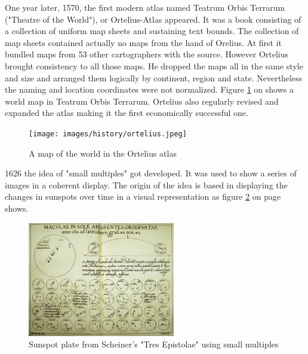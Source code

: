 One year later, 1570, the first modern atlas named Teatrum Orbis Terrarum ("Theatre of the World"), or Ortelius-Atlas appeared. It was a book consisting of a collection of uniform map sheets and sustaining text bounds. The collection of map sheets contained actually no maps from the hand of Orelius. At first it bundled maps from 53 other cartographers with the source. However Ortelius brought consistency to all those maps. He dropped the maps all in the same style and size and arranged them logically by continent, region and state. Nevertheless the naming and location coordinates were not normalized. Figure \ref{fig:ortelius} on \pageref{fig:ortelius} shows a world map in Teatrum Orbis Terrarum. Ortelius also regularly revised and expanded the atlas making it the first economically successful one.

\begin{figure}[!htb]
\centering
\texttt{[image: images/history/ortelius.jpeg]}
\caption[
    A map of the world in the Ortelius atlas, Urldate: 07.2016 \newline
\small\texttt{\url{https://upload.wikimedia.org/wikipedia/commons/6/6f/OrteliusWorldMap.jpeg}}
]{A map of the world in the Ortelius atlas}
\label{fig:ortelius}
\end{figure}

1626 the idea of "small multiples" got developed. It was used to show a series of images in a coherent display. The origin of the idea is based in displaying the changes in sunspots over time in a visual representation as figure \ref{fig:small-multiples} on page \pageref{fig:small-multiples} shows.

\begin{figure}[!htb]
\centering
\includegraphics[height=5cm,keepaspectratio]{images/history/small-multiples.png}
\caption[
    Sunspot plate from Scheiner's "Tres Epistolae" using small multiples, Urldate: 07.2016 \newline
\small\texttt{\url{http://cnx.rice.edu/content/m11970/latest/tres_epistolae.gif}}
]{Sunspot plate from Scheiner's "Tres Epistolae" using small multiples}
\label{fig:small-multiples}
\end{figure}


